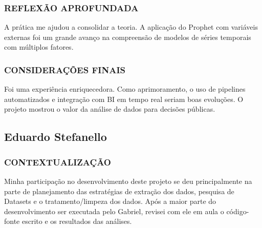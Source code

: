 \documentclass{article}
\begin{document}
\subsubsection{REFLEXÃO APROFUNDADA}
A prática me ajudou a consolidar a teoria. A aplicação do Prophet com variáveis externas foi um grande avanço na compreensão de modelos de séries temporais com múltiplos fatores.

\subsubsection{CONSIDERAÇÕES FINAIS}
Foi uma experiência enriquecedora. Como aprimoramento, o uso de pipelines automatizados e integração com BI em tempo real seriam boas evoluções. O projeto mostrou o valor da análise de dados para decisões públicas.

\subsection{Eduardo Stefanello}

\subsubsection{CONTEXTUALIZAÇÃO}
Minha participação no desenvolvimento deste projeto se deu principalmente na parte de planejamento das estratégias de extração dos dados, pesquisa de Datasets e o tratamento/limpeza dos dados. Após a maior parte do desenvolvimento ser executada pelo Gabriel, revisei com ele em aula o código-fonte escrito e os resultados das análises.
\end{document}
